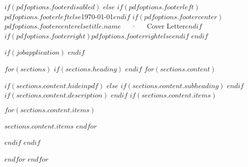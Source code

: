 \documentclass[$if(pdfoptions.fontsize)$$pdfoptions.fontsize$$else$10pt$endif$, a4paper]{puredoc-cv}
\begin{document}

$if(pdfoptions.footerdisabled)$
$else$
\makecvfooter
  {$if(pdfoptions.footerleft)$$pdfoptions.footerleft$$else$\today$endif$}
  {$if(pdfoptions.footercenter)$$pdfoptions.footercenter$$else$$title.name$~~~·~~~Cover Letter$endif$}
  {$if(pdfoptions.footerright)$$pdfoptions.footerright$$else$\thepage$endif$}
$endif$

$if(jobapplication)$
\cvskip
{}
\cvskip
\cvskip[m]
\cvskip[s]
\cvskip
$endif$

$for(sections)$
$if(sections.heading)$
$endif$
$for(sections.content)$
\begin{skipwrapper}
$if(sections.content.hideinpdf)$
$else$
$if(sections.content.subheading)$
$endif$
$if(sections.content.description)$
$endif$
$if(sections.content.items)$
  \begin{cvitems}
$for(sections.content.items)$
    \item {$sections.content.items$}
$endfor$
  \end{cvitems}
$endif$
$endif$
\end{skipwrapper}
$endfor$
$endfor$

\cvskip
\cvskip[m]
\cvskip
{}
\end{document}

